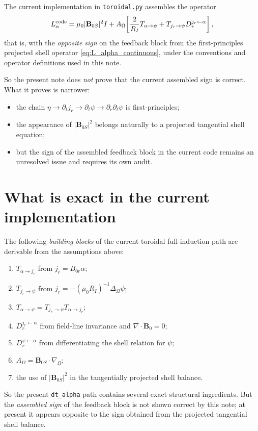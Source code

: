 \documentclass[11pt,a4paper]{article}
\begin{document}
The current implementation in \texttt{toroidal.py} assembles the operator
\[
L_\alpha^{\rm code}
=
\mu_0 |\mathbf B_{0S}|^2 I
+
A_\Omega\!\left[
\frac{2}{R_I}T_{\alpha\to\psi}
+
T_{j_r\to\psi} D_r^{j_r\leftarrow\alpha}
\right],
\]
that is, with the \emph{opposite sign} on the feedback block from the
first-principles projected shell operator \eqref{eq:L_alpha_continuous}, under
the conventions and operator definitions used in this note.

So the present note does \emph{not} prove that the current assembled sign is
correct. What it proves is narrower:
\begin{itemize}
\item the chain
$\eta \to \partial_t j_r \to \partial_t\psi \to \partial_r\partial_t\psi$ is
first-principles;
\item the appearance of $|\mathbf B_{0S}|^2$ belongs naturally to a projected
tangential shell equation;
\item but the sign of the assembled feedback block in the current code remains
an unresolved issue and requires its own audit.
\end{itemize}

\section{What is exact in the current implementation}

The following \emph{building blocks} of the current toroidal full-induction path
are derivable from the assumptions above:
\begin{enumerate}
\item $T_{\alpha\to j_r}$ from $j_r = B_{0r}\alpha$;
\item $T_{j_r\to\psi}$ from
$j_r = -(\mu_0 R_I)^{-1}\Delta_\Omega \psi$;
\item $T_{\alpha\to\psi} = T_{j_r\to\psi} T_{\alpha\to j_r}$;
\item $D_r^{j_r\leftarrow\alpha}$ from field-line invariance and
$\nabla\cdot \mathbf B_0 = 0$;
\item $D_r^{\psi\leftarrow\alpha}$ from differentiating the shell relation for
$\psi$;
\item $A_\Omega = \mathbf B_{0S}\cdot \nabla_\Omega$;
\item the use of $|\mathbf B_{0S}|^2$ in the tangentially projected shell
balance.
\end{enumerate}

So the present \texttt{dt\_alpha} path contains several exact structural
ingredients. But the \emph{assembled sign} of the feedback block is not shown
correct by this note; at present it appears opposite to the sign obtained from
the projected tangential shell balance.
\end{document}
